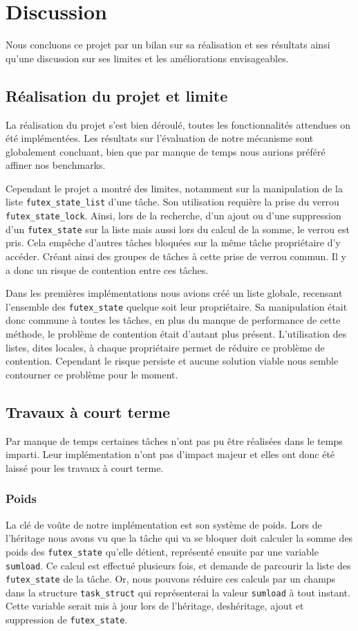 \section{Discussion}

Nous concluons ce projet par un bilan sur sa réalisation et ses résultats ainsi qu'une discussion sur 
ses limites et les améliorations envisageables.

\subsection{Réalisation du projet et limite}

La réalisation du projet s'est bien déroulé, toutes les fonctionnalités attendues on été
implémentées.
Les résultats sur l'évaluation de notre mécanisme sont globalement concluant, bien que 
par manque de temps nous aurions préféré affiner nos benchmarks.

Cependant le projet a montré des limites, notamment sur la manipulation de la liste \verb|futex_state_list| d'une tâche.
Son utilisation requière la prise du verrou \verb|futex_state_lock|.
Ainsi, lors de la recherche, d'un ajout ou d'une suppression d'un \verb|futex_state|
sur la liste mais aussi lors du calcul de la somme, le verrou est pris. Cela empêche d'autres tâches bloquées
sur la même tâche propriétaire d'y accéder. Créant ainsi des groupes de tâches à cette prise de
verrou commun. Il y a donc un risque de contention entre ces tâches.

Dans les premières implémentations nous avions créé un liste globale, recensant l'ensemble des \verb|futex_state| quelque soit
leur propriétaire. Sa manipulation était donc commune à toutes les tâches, en plus du manque de performance de 
cette méthode, le problème de contention était d'autant plus présent. L'utilisation des listes, dites locales, à chaque
propriétaire permet de réduire ce problème de contention. Cependant le risque persiste et aucune solution 
viable nous semble contourner ce problème pour le moment.

\subsection{Travaux à court terme}
Par manque de temps certaines tâches n'ont pas pu être réalisées dans le temps imparti.
Leur implémentation n'ont pas d'impact majeur et elles ont donc été laissé pour les travaux à court terme.

\subsubsection{Poids}
La clé de voûte de notre implémentation est son système de poids.
Lors de l'héritage nous avons vu que la tâche qui va se bloquer doit calculer la somme
des poids des \verb|futex_state| qu'elle détient, représenté ensuite par une variable \verb|sumload|.
Ce calcul est effectué plusieurs fois, et demande de parcourir la liste des \verb|futex_state| de la tâche.
Or, nous pouvons réduire ces calculs par un champs dans la structure \verb|task_struct| qui représenterai
la valeur \verb|sumload| à tout instant. Cette variable serait mis à jour lors de l'héritage, deshéritage,
ajout et suppression de \verb|futex_state|.

